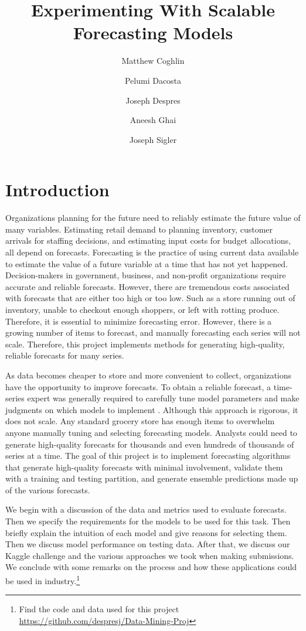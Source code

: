 \documentclass[16pt,twocolumn,letterpaper,titlepage]{article}
\title{Experimenting With Scalable Forecasting Models}
\author{
    Matthew Coghlin\\
  	\and
  	Pelumi Dacosta\\
    \and
    Joseph Despres\\
    \and
    Aneesh Ghai\\
    \and
    Joseph Sigler\\
}
\begin{document}
\maketitle


\onecolumn
\tableofcontents
\thispagestyle{empty}
\newpage
\twocolumn


\setcounter{page}{1}

\section{Introduction}

Organizations planning for the future need to reliably estimate the future value of many variables. Estimating retail demand to planning inventory, customer arrivals for staffing decisions, and estimating input costs for budget allocations, all depend on forecasts. Forecasting is the practice of using current data available to estimate the value of a future variable at a time that has not yet happened. Decision-makers in government, business, and non-profit organizations require accurate and reliable forecasts. However, there are tremendous costs associated with forecasts that are either too high or too low. Such as a store running out of inventory, unable to checkout enough shoppers, or left with rotting produce. Therefore, it is essential to minimize forecasting error. However, there is a growing number of items to forecast, and manually forecasting each series will not scale. Therefore, this project implements methods for generating high-quality, reliable forecasts for many series. 


As data becomes cheaper to store and more convenient to collect, organizations have the opportunity to improve forecasts. To obtain a reliable forecast, a time-series expert was generally required to carefully tune model parameters and make judgments on which models to implement \cite{taylor2018forecasting}. Although this approach is rigorous, it does not scale. Any standard grocery store has enough items to overwhelm anyone manually tuning and selecting forecasting models. Analysts could need to generate high-quality forecasts for thousands and even hundreds of thousands of series at a time. The goal of this project is to implement forecasting algorithms that generate high-quality forecasts with minimal involvement, validate them with a training and testing partition, and generate ensemble predictions made up of the various forecasts.


We begin with a discussion of the data and metrics used to evaluate forecasts. Then we specify the requirements for the models to be used for this task. Then briefly explain the intuition of each model and give reasons for selecting them. Then we discuss model performance on testing data. After that, we discuss our Kaggle challenge and the various approaches we took when making submissions. We conclude with some remarks on the process and how these applications could be used in industry.\footnote{Find the code and data used for this project \url{https://github.com/despresj/Data-Mining-Proj}  } 
\end{document}
